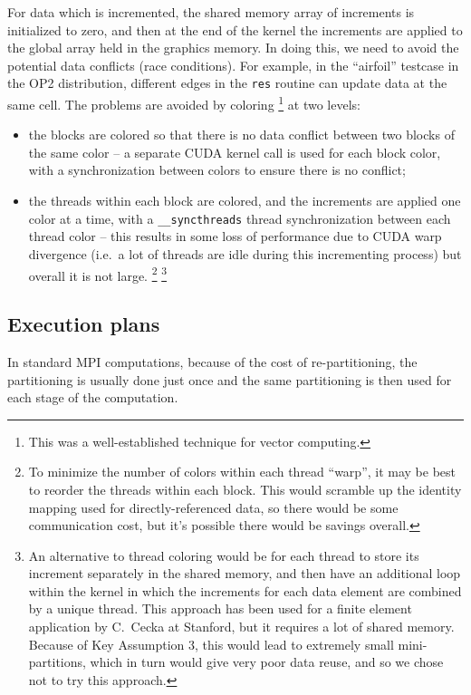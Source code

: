 \documentclass[11pt]{article}
\begin{document}
For data which is incremented, the shared memory array of increments is
initialized to zero, and then at the end of the kernel the increments are
applied to the global array held in the graphics memory.  In doing this,
we need to avoid the potential data conflicts (race conditions).
For example, in the ``airfoil'' testcase in the OP2 distribution,
different edges in the {\tt res} routine can update data at the same
cell.  The problems are avoided by coloring
\footnote{This was a well-established technique for vector computing.}
at two levels:
\begin{itemize}
\item
the blocks are colored so that there is no data conflict between two
blocks of the same color -- a separate CUDA kernel call is used for each
block color, with a synchronization between colors to ensure there is no
conflict;
\item
the threads within each block are colored, and the increments are applied
one color at a time, with a {\tt \_\_syncthreads} thread synchronization
between each thread color -- this results in some loss of performance due
to CUDA warp divergence (i.e.~a lot of threads are idle during this
incrementing process) but overall it is not large.
\footnote{To minimize the number of colors within each thread ``warp'',
it may be best to reorder the threads within each block.  This would
scramble up the identity mapping used for directly-referenced data,
so there would be some communication cost, but it's possible there would
be savings overall.}
\footnote{
An alternative to thread coloring would be for each thread to store its
increment separately in the shared memory, and then have an additional loop
within the kernel in which the increments for each data element are combined
by a unique thread.  This approach has been used for a finite element
application by C.~Cecka at Stanford, but it requires a lot of shared memory.
Because of Key Assumption 3, this would lead to extremely small
mini-partitions, which in turn would give very poor data reuse, and so
we chose not to try this approach.}

\end{itemize}


\subsection{Execution plans}

In standard MPI computations, because of the cost of re-partitioning,
the partitioning is usually done just once and the same partitioning is
then used for each stage of the computation.
\end{document}
